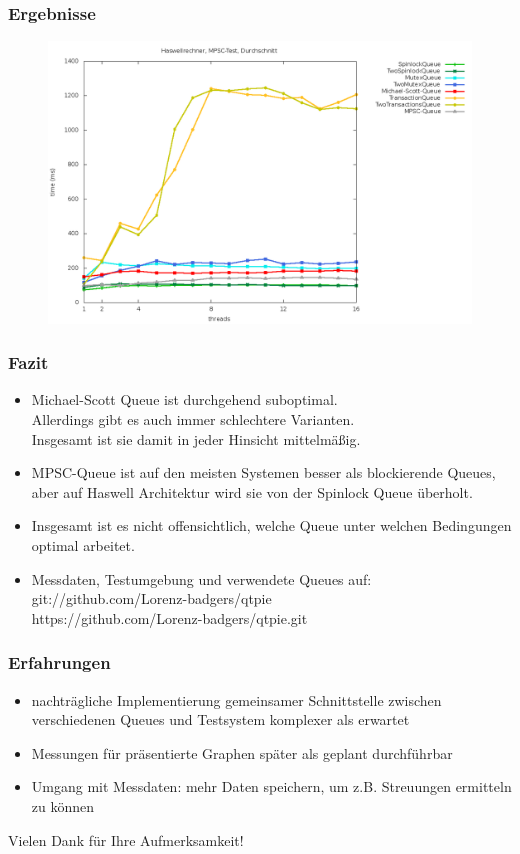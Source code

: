 \documentclass[svgnames]{beamer}
\begin{document}
\begin{frame}
\frametitle{Ergebnisse}
\begin {figure}
      \begin{center}
	\includegraphics[width=\textwidth]{fastboxsa.png}
     \end{center}
\end {figure}
\end{frame}



\begin{frame}
\frametitle{Fazit}
\begin{itemize}
\item Michael-Scott Queue ist durchgehend suboptimal.\\
	Allerdings gibt es auch immer schlechtere Varianten.\\
	Insgesamt ist sie damit in jeder Hinsicht mittelm\"a\ss{}ig.
\item MPSC-Queue ist auf den meisten Systemen besser als blockierende Queues,
	aber auf Haswell Architektur wird sie von der Spinlock Queue \"uberholt.
\item Insgesamt ist es nicht offensichtlich, welche Queue unter welchen Bedingungen optimal arbeitet.
\item Messdaten, Testumgebung und verwendete Queues auf:\\
	git://github.com/Lorenz-badgers/qtpie \\
	https://github.com/Lorenz-badgers/qtpie.git
\end{itemize}
\end{frame}


\begin{frame}
\frametitle{Erfahrungen}
\begin{itemize}
\item nachtr\"agliche Implementierung gemeinsamer Schnittstelle zwischen verschiedenen Queues und Testsystem komplexer als erwartet
\item Messungen f\"ur pr\"asentierte Graphen sp\"ater als geplant durchf\"uhrbar
\item Umgang mit Messdaten: mehr Daten speichern, um z.B. Streuungen ermitteln zu k\"onnen
\end{itemize}
\end{frame}



\begin{frame}
\Large{\centerline{Vielen Dank f\"ur Ihre Aufmerksamkeit!}}
\end{frame}
\end{document}
